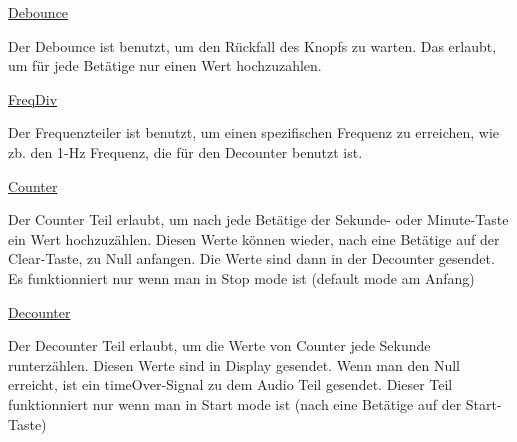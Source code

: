 \documentclass[a4paper, 11pt]{article}
\begin{document}
	    \begin{flushleft} %
	    \underline{\large Debounce} %
	    \vspace{0.1cm} %
    
	     {\small Der Debounce ist benutzt, um den Rückfall des Knopfs zu warten.  Das erlaubt, um für jede Betätige nur einen Wert hochzuzahlen.} %
     
	     \vspace{1cm} %
     
	     \underline{\large FreqDiv}
     
	     \vspace{0.1cm}
     
	      {\small Der Frequenzteiler ist benutzt, um einen spezifischen Frequenz zu erreichen, wie zb. den 1-Hz Frequenz, die für den Decounter benutzt ist.  
		  }
     
	     \newpage
     
	     \underline{\large Counter}
     
	     \vspace{0.1cm}
     
		  {\small Der Counter Teil erlaubt, um nach jede Betätige der Sekunde- oder Minute-Taste ein Wert hochzuzählen. Diesen Werte können wieder, nach eine Betätige auf der Clear-Taste, zu Null anfangen.
		  \newline
		  Die Werte sind dann in der Decounter gesendet.
		  \newline
	       Es funktionniert nur wenn man in Stop mode ist (default mode am Anfang)
	      }
     
		 \vspace{1cm}
     
	     \underline{\large Decounter} 
     
	     \vspace{0.1cm}
     
	     {\small Der Decounter Teil erlaubt, um die Werte von Counter jede Sekunde runterzählen. Diesen Werte sind in Display gesendet.
	     \newline
	     Wenn man den Null erreicht, ist ein timeOver-Signal zu dem Audio Teil gesendet.
		 \newline
	     Dieser Teil funktionniert nur wenn man in Start mode ist (nach eine Betätige auf der Start-Taste)
	     }
     
	     \vspace{1cm}
     

\end{flushleft}
\end{document}
